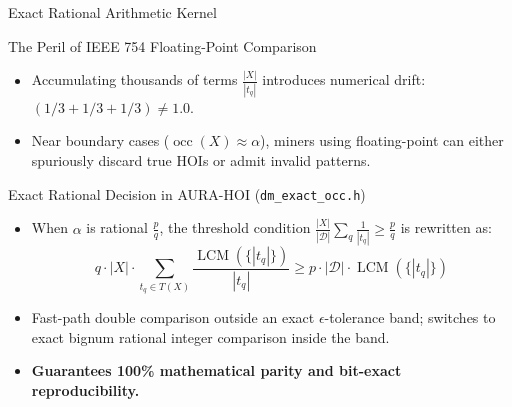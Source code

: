 \documentclass[aspectratio=169,10pt]{beamer}
\newcommand{\AURA}{\textsc{AURA-HOI}}
\newcommand{\occ}{\operatorname{occ}}
\begin{document}
\begin{frame}{Exact Rational Arithmetic Kernel}
  \begin{alertblock}{The Peril of IEEE 754 Floating-Point Comparison}
    \begin{itemize}
      \item Accumulating thousands of terms $\frac{|X|}{|t_q|}$ introduces numerical drift: $(1/3 + 1/3 + 1/3) \neq 1.0$.
      \item Near boundary cases ($\occ(X) \approx \alpha$), miners using floating-point can either spuriously discard true HOIs or admit invalid patterns.
    \end{itemize}
  \end{alertblock}

  \begin{block}{Exact Rational Decision in \AURA{} (\texttt{dm\_exact\_occ.h})}
    \begin{itemize}
      \item When $\alpha$ is rational $\frac{p}{q}$, the threshold condition $\frac{|X|}{|\mathcal{D}|} \sum_{q} \frac{1}{|t_q|} \ge \frac{p}{q}$ is rewritten as:
      $$q \cdot |X| \cdot \sum_{t_q \in T(X)} \frac{\operatorname{LCM}(\{|t_q|\})}{|t_q|} \ge p \cdot |\mathcal{D}| \cdot \operatorname{LCM}(\{|t_q|\})$$
      \item Fast-path double comparison outside an exact $\epsilon$-tolerance band; switches to exact bignum rational integer comparison inside the band.
      \item \textbf{Guarantees 100\% mathematical parity and bit-exact reproducibility.}
    \end{itemize}
  \end{block}
\end{frame}
\end{document}
